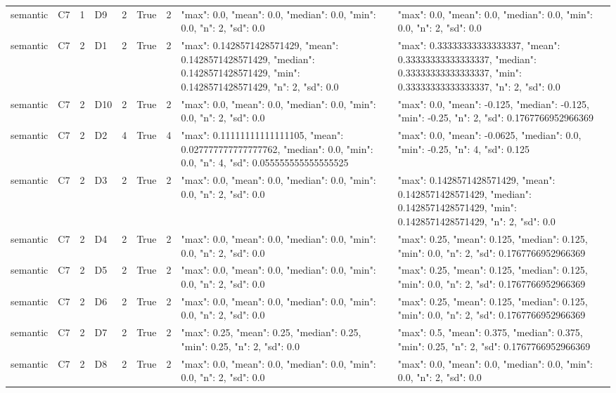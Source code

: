\begin{tabular}{lllllllll}
semantic & C7 & 1 & D9 & 2 & True & 2 & {"max": 0.0, "mean": 0.0, "median": 0.0, "min": 0.0, "n": 2, "sd": 0.0} & {"max": 0.0, "mean": 0.0, "median": 0.0, "min": 0.0, "n": 2, "sd": 0.0} \\
semantic & C7 & 2 & D1 & 2 & True & 2 & {"max": 0.1428571428571429, "mean": 0.1428571428571429, "median": 0.1428571428571429, "min": 0.1428571428571429, "n": 2, "sd": 0.0} & {"max": 0.33333333333333337, "mean": 0.33333333333333337, "median": 0.33333333333333337, "min": 0.33333333333333337, "n": 2, "sd": 0.0} \\
semantic & C7 & 2 & D10 & 2 & True & 2 & {"max": 0.0, "mean": 0.0, "median": 0.0, "min": 0.0, "n": 2, "sd": 0.0} & {"max": 0.0, "mean": -0.125, "median": -0.125, "min": -0.25, "n": 2, "sd": 0.1767766952966369} \\
semantic & C7 & 2 & D2 & 4 & True & 4 & {"max": 0.11111111111111105, "mean": 0.027777777777777762, "median": 0.0, "min": 0.0, "n": 4, "sd": 0.055555555555555525} & {"max": 0.0, "mean": -0.0625, "median": 0.0, "min": -0.25, "n": 4, "sd": 0.125} \\
semantic & C7 & 2 & D3 & 2 & True & 2 & {"max": 0.0, "mean": 0.0, "median": 0.0, "min": 0.0, "n": 2, "sd": 0.0} & {"max": 0.1428571428571429, "mean": 0.1428571428571429, "median": 0.1428571428571429, "min": 0.1428571428571429, "n": 2, "sd": 0.0} \\
semantic & C7 & 2 & D4 & 2 & True & 2 & {"max": 0.0, "mean": 0.0, "median": 0.0, "min": 0.0, "n": 2, "sd": 0.0} & {"max": 0.25, "mean": 0.125, "median": 0.125, "min": 0.0, "n": 2, "sd": 0.1767766952966369} \\
semantic & C7 & 2 & D5 & 2 & True & 2 & {"max": 0.0, "mean": 0.0, "median": 0.0, "min": 0.0, "n": 2, "sd": 0.0} & {"max": 0.25, "mean": 0.125, "median": 0.125, "min": 0.0, "n": 2, "sd": 0.1767766952966369} \\
semantic & C7 & 2 & D6 & 2 & True & 2 & {"max": 0.0, "mean": 0.0, "median": 0.0, "min": 0.0, "n": 2, "sd": 0.0} & {"max": 0.25, "mean": 0.125, "median": 0.125, "min": 0.0, "n": 2, "sd": 0.1767766952966369} \\
semantic & C7 & 2 & D7 & 2 & True & 2 & {"max": 0.25, "mean": 0.25, "median": 0.25, "min": 0.25, "n": 2, "sd": 0.0} & {"max": 0.5, "mean": 0.375, "median": 0.375, "min": 0.25, "n": 2, "sd": 0.1767766952966369} \\
semantic & C7 & 2 & D8 & 2 & True & 2 & {"max": 0.0, "mean": 0.0, "median": 0.0, "min": 0.0, "n": 2, "sd": 0.0} & {"max": 0.0, "mean": 0.0, "median": 0.0, "min": 0.0, "n": 2, "sd": 0.0} \\

\end{tabular}
